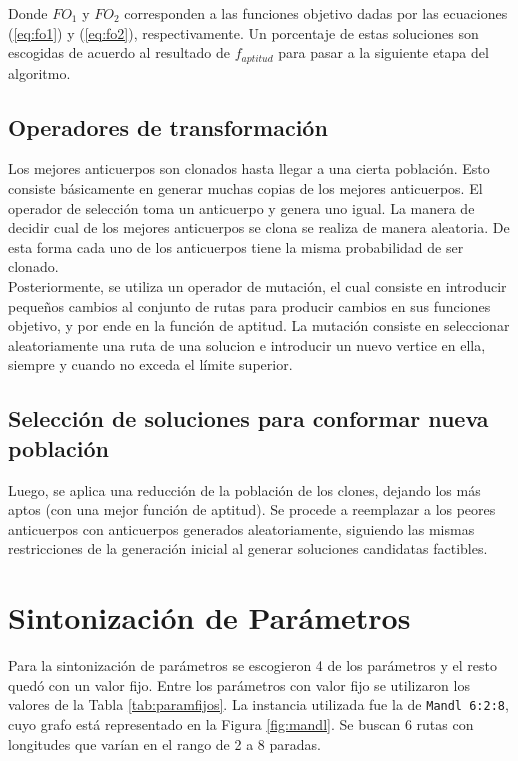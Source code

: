 Donde $FO_1$ y $FO_2$ corresponden a las funciones objetivo dadas por las ecuaciones (\ref{eq:fo1}) y (\ref{eq:fo2}), respectivamente. Un porcentaje de estas soluciones son escogidas de acuerdo al resultado de $f_{aptitud}$ para pasar a la siguiente etapa del algoritmo.

\subsection{Operadores de transformación}

Los mejores anticuerpos son clonados hasta llegar a una cierta población. Esto consiste básicamente en generar muchas copias de los mejores anticuerpos. El operador de selección toma un anticuerpo y genera uno igual. La manera de decidir cual de los mejores anticuerpos se clona se realiza de manera aleatoria. De esta forma cada uno de los anticuerpos tiene la misma probabilidad de ser clonado.\\

Posteriormente, se utiliza un operador de mutación, el cual consiste en introducir pequeños cambios al conjunto de rutas para producir cambios en sus funciones objetivo, y por ende en la función de aptitud. La mutación consiste en seleccionar aleatoriamente una ruta de una solucion e introducir un nuevo vertice en ella, siempre y cuando no exceda el límite superior.


\subsection{Selección de soluciones para conformar nueva población}

Luego, se aplica una reducción de la población de los clones, dejando los más aptos (con una mejor función de aptitud). Se procede a reemplazar a los peores anticuerpos con anticuerpos generados aleatoriamente, siguiendo las mismas restricciones de la generación inicial al generar soluciones candidatas factibles. 



\section{Sintonización de Parámetros}

Para la sintonización de parámetros se escogieron 4 de los parámetros y el resto quedó con un valor fijo. Entre los parámetros con valor fijo se utilizaron los valores de la Tabla \ref{tab:paramfijos}. La instancia utilizada fue la de \texttt{Mandl 6:2:8}, cuyo grafo está representado en la Figura \ref{fig:mandl}. Se buscan 6 rutas con longitudes que varían en el rango de 2 a 8 paradas.

